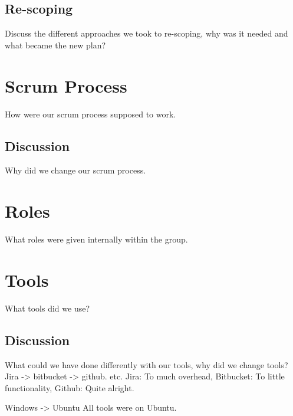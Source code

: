 \subsection{Re-scoping}
Discuss the different approaches we took to re-scoping,
why was it needed and what became the new plan?

\section{Scrum Process}
How were our scrum process supposed to work.
\subsection{Discussion}
Why did we change our scrum process.

\section{Roles}
What roles were given internally within the group.

\section{Tools}
What tools did we use?

\subsection{Discussion}
What could we have done differently with our tools,
why did we change tools?
Jira -> bitbucket -> github. etc.
Jira: To much overhead,
Bitbucket: To little functionality,
Github: Quite alright.

Windows -> Ubuntu
All tools were on Ubuntu.


